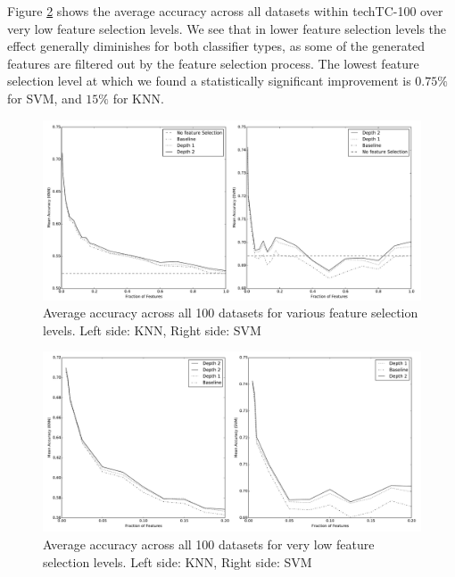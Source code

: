 \documentclass{article}
\theoremstyle{definition}
\begin{document}
Figure \ref{fig:accuracy_low} shows the average accuracy across all datasets within techTC-100 over very low feature selection levels. 
We see that in lower feature selection levels the effect generally diminishes for both classifier types, as some of the generated features are filtered out by the feature selection process. The lowest feature selection level at which we found a statistically significant improvement is $0.75\%$ for SVM, and $15\%$ for KNN.

\begin{figure}[H]
	\centering
	\includegraphics[width=\linewidth]{acc2.pdf}
	\caption{Average accuracy across all 100 datasets for various feature selection levels. Left side: KNN, Right side: SVM}
	\label{fig:accuracy}
\end{figure}

\begin{figure}[H]
	\centering
	\includegraphics[width=\linewidth]{acc_low2.pdf}
	\caption{Average accuracy across all 100 datasets for very low feature selection levels. Left side: KNN, Right side: SVM}
	\label{fig:accuracy_low}
\end{figure}
\end{document}
